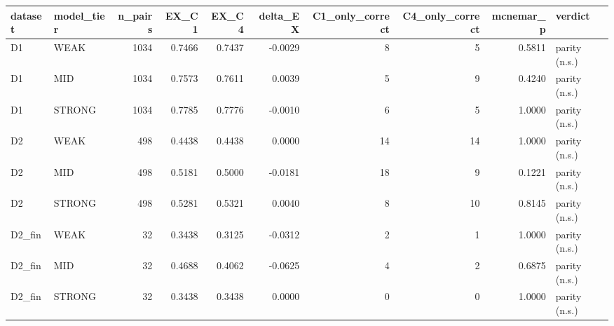 \begin{tabular}{llrrrrrrrl}
\toprule
dataset & model\_tier & n\_pairs & EX\_C1 & EX\_C4 & delta\_EX & C1\_only\_correct & C4\_only\_correct & mcnemar\_p & verdict \\
\midrule
D1 & WEAK & 1034 & 0.7466 & 0.7437 & -0.0029 & 8 & 5 & 0.5811 & parity (n.s.) \\
D1 & MID & 1034 & 0.7573 & 0.7611 & 0.0039 & 5 & 9 & 0.4240 & parity (n.s.) \\
D1 & STRONG & 1034 & 0.7785 & 0.7776 & -0.0010 & 6 & 5 & 1.0000 & parity (n.s.) \\
D2 & WEAK & 498 & 0.4438 & 0.4438 & 0.0000 & 14 & 14 & 1.0000 & parity (n.s.) \\
D2 & MID & 498 & 0.5181 & 0.5000 & -0.0181 & 18 & 9 & 0.1221 & parity (n.s.) \\
D2 & STRONG & 498 & 0.5281 & 0.5321 & 0.0040 & 8 & 10 & 0.8145 & parity (n.s.) \\
D2\_fin & WEAK & 32 & 0.3438 & 0.3125 & -0.0312 & 2 & 1 & 1.0000 & parity (n.s.) \\
D2\_fin & MID & 32 & 0.4688 & 0.4062 & -0.0625 & 4 & 2 & 0.6875 & parity (n.s.) \\
D2\_fin & STRONG & 32 & 0.3438 & 0.3438 & 0.0000 & 0 & 0 & 1.0000 & parity (n.s.) \\
\bottomrule
\end{tabular}
